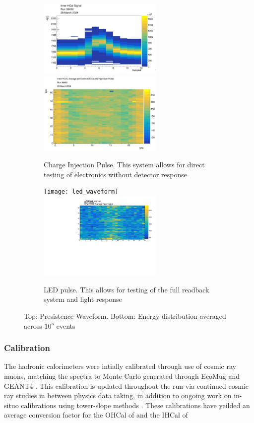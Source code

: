 \documentclass[letterpaper, 12pt, oneside]{book}
\theoremstyle{definition}
\begin{document}
		\begin{figure}
			\begin{subfigure}[t]{0.4\textwidth}
				\includegraphics[width=6cm]{pulser_waveform}
				\includegraphics[width=6cm]{ihcal_pulser.png}
				\caption{Charge Injection Pulse. This system allows for direct testing of electronics without detector response}
			\end{subfigure}
			\hfill
			\begin{subfigure}[t]{0.4\textwidth}
				\texttt{[image: led\_waveform]}
				\includegraphics[width=6cm]{ihcal_led}
				\caption{LED pulse. This allows for testing of the full readback system and light response}
			\end{subfigure}
				\caption{Top: Presistence Waveform. Bottom: Energy distribution averaged across $10^{5}$ events}
			\label{fig:hcal_tests}
		\end{figure}
		\subsubsection{Calibration}
			The hadronic calorimeters were intially calibrated through use of cosmic ray muons, matching the spectra to Monte Carlo 
			generated through EcoMug and GEANT4 \cite{HCal_Calib}. 
			This calibration is updated throughout the run via continued cosmic ray studies in between physics data taking, in addition
			to ongoing work on in-situo calibrations using tower-slope methods \cite{tower_slope_hcal}. 
			These calibrations have yeilded an average conversion factor for the OHCal of and the IHCal of %
\end{document}
